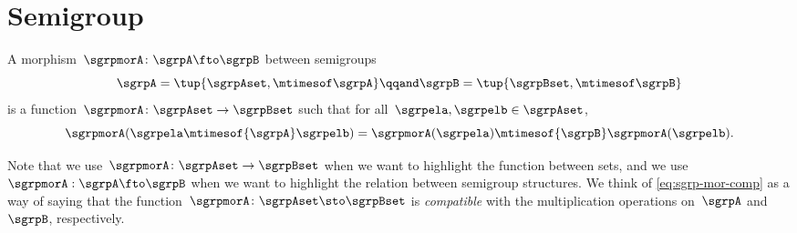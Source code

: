 

\section{Semigroup \wHomos}
\label{sec:semigroup-morphisms}



\begin{ctdefinition}
	\label{def:semigroup-mor}
	A morphism~$\sgrpmorA\colon \sgrpA \fto \sgrpB$ between semigroups
	\begin{equation}
		\label{eq:sgrpAB}
		\sgrpA = \tup{\sgrpAset, \mtimesof\sgrpA}
		\qqand
		\sgrpB = \tup{\sgrpBset, \mtimesof\sgrpB}
	\end{equation}
	is a function~$\sgrpmorA\colon \sgrpAset \to \sgrpBset$ such that for all~$\sgrpela, \sgrpelb \in \sgrpAset$,
	\begin{equation}
		\label{eq:sgrp-mor-comp}
		\sgrpmorA(\sgrpela \mtimesof{\sgrpA} \sgrpelb) = \sgrpmorA (\sgrpela) \mtimesof{\sgrpB} \sgrpmorA(\sgrpelb).
	\end{equation}
\end{ctdefinition}

Note that we use~$\sgrpmorA\colon \sgrpAset \to \sgrpBset$ when we want to highlight the function between sets, and we use~$\sgrpmorA: \sgrpA \fto \sgrpB$ when we want to highlight the relation between semigroup structures.
We think of \cref{eq:sgrp-mor-comp} as a way of saying that the function~$\sgrpmorA\colon \sgrpAset \sto \sgrpBset$  is \emph{compatible} with the multiplication operations on~$\sgrpA$ and~$\sgrpB$, respectively.

